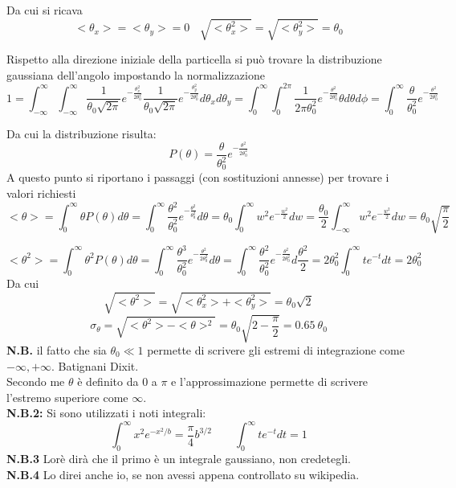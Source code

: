 \documentclass[twoside]{article}
\begin{document}
Da cui si ricava
\begin{equation}
    <\theta_x>=<\theta_y>=0 \ \ \ \ \sqrt{<\theta_x^2>}=\sqrt{<\theta_y^2>}=\theta_0
\end{equation}

Rispetto alla direzione iniziale della particella si può trovare la distribuzione gaussiana dell'angolo impostando la normalizzazione
\begin{equation}
    1=\int_{-\infty}^\infty\int_{-\infty}^\infty \frac{1}{\theta_0\sqrt{2\pi}}e^{-\frac{\theta_x^2}{2\theta_0^2}}\frac{1}{\theta_0\sqrt{2\pi}}e^{-\frac{\theta_y^2}{2\theta_0^2}}d\theta_x d\theta_y=\int_0^\infty \int_0^{2\pi} \frac{1}{2\pi \theta_0^2}e^{-\frac{\theta^2}{2\theta_0^2}}\theta d\theta d\phi=\int_0^\infty \frac{\theta}{\theta_0^2}e^{-\frac{\theta^2}{2\theta_0^2}}
\end{equation}

Da cui la distribuzione risulta:
\begin{equation}
    P(\theta)=\frac{\theta}{\theta_0^2}e^{-\frac{\theta^2}{2\theta_0^2}}
\end{equation}
A questo punto si riportano i passaggi (con sostituzioni annesse) per trovare i valori richiesti
\begin{equation*}
    <\theta>=\int_0^\infty \theta P(\theta)d\theta=\int_0^\infty \frac{\theta^2}{\theta_0^2}e^{-\frac{\theta^2}{\theta_0^2}}d\theta=\theta_0\int_0^\infty w^2e^{-\frac{w^2}{2}}dw=\frac{\theta_0}{2}\int_{-\infty}^\infty w^2 e^{-\frac{w^2}{2}}dw=\theta_0\sqrt{\frac{\pi}{2}}
\end{equation*}

\begin{equation*}
    <\theta^2>=\int_0^\infty \theta^2P(\theta)d\theta=\int_0^\infty \frac{\theta^3}{\theta_0^2}e^{-\frac{\theta^2}{2\theta_0^2}}d\theta=\int_0^\infty \frac{\theta^2}{\theta_0^2}e^{-\frac{\theta^2}{2\theta_0^2}}d\frac{\theta^2}{2}=2\theta_0^2 \int_0^\infty te^{-t}dt=2\theta_0^2
\end{equation*}
Da cui
\begin{equation}
    \sqrt{<\theta^2>}=\sqrt{<\theta_x^2>+<\theta_y^2>}=\theta_0\sqrt{2}
\end{equation}
\begin{equation}
    \sigma_{\theta}=\sqrt{<\theta^2>-<\theta>^2}=\theta_0\sqrt{2-\frac{\pi}{2}}=0.65\ \theta_0
\end{equation}
\textbf{N.B.} il fatto che sia $\theta_0\ll 1$ permette di scrivere gli estremi di integrazione come $-\infty,+\infty$. Batignani Dixit.\\
Secondo me $\theta$ è definito da 0 a $\pi$ e l'approssimazione permette di scrivere l'estremo superiore come $\infty$.\\
\textbf{N.B.2:} Si sono utilizzati i noti integrali:
\begin{equation}
     \int_0^\infty x^2e^{-x^2/b}=\frac{\pi}{4}b^{3/2} \qquad \int_0^\infty te^{-t}dt=1
\end{equation}
\textbf{N.B.3} Lorè dirà che il primo è un integrale gaussiano, non credetegli.\\
\textbf{N.B.4} Lo direi anche io, se non avessi appena controllato su wikipedia.
\end{document}
